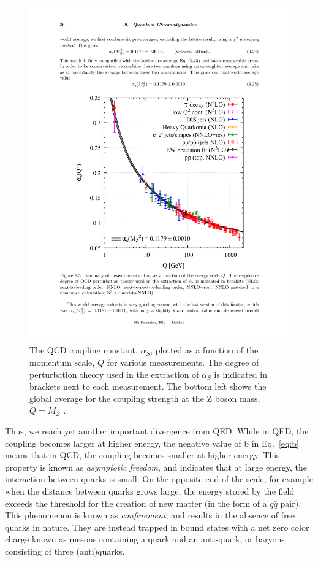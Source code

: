   \begin{figure}[htpb]
    \centering
    \includegraphics[trim={3.5cm 5.9cm 3cm 7cm},clip,width=1.0\textwidth] {Introduction/a_S_running.pdf}
    \caption{The QCD coupling constant, $\alpha_S$, plotted as a function of the momentum scale,  $Q$ for various measurements. The degree of perturbation theory used in the extraction of  $\alpha_S$ is indicated in brackets next to each measurement. The bottom left shows the global average for the coupling strength at the Z boson mass, $Q=M_Z$ \cite{zotero-314}.}
    \label{fig:a_S_running}
  \end{figure}
  

  Thus, we reach yet another important divergence from QED: While in QED, the coupling becomes larger at higher energy, the negative value of b in Eq.~\ref{eq:b} means that in QCD, the coupling becomes smaller at higher energy. This property is known as \textit{asymptotic freedom}, and indicates that at large energy, the interaction between quarks is small. 
  On the opposite end of the scale, for example when the distance between quarks grows large, the energy stored by the field exceeds the threshold for the creation of new matter (in the form of a $q\bar{q}$ pair). This phenomenon is known as \textit{confinement}, and results in the absence of free quarks in nature. They are instead trapped in bound states with a net zero color charge known as mesons containing a quark and an anti-quark, or baryons consisting of three (anti)quarks.

